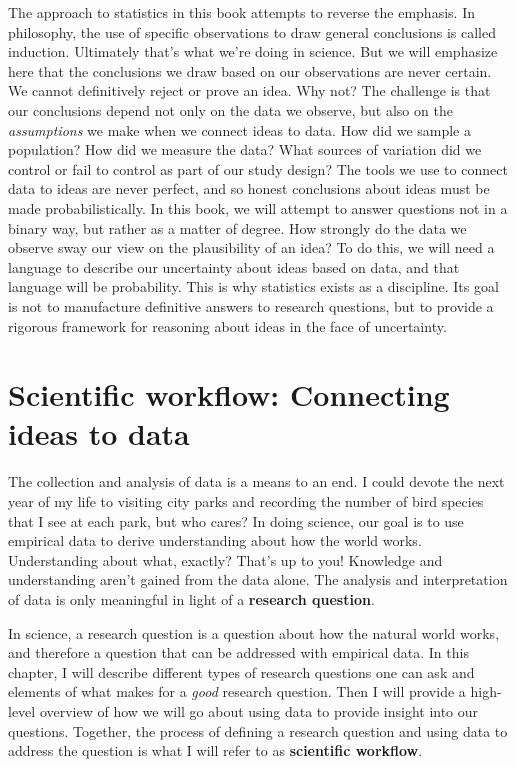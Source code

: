 \documentclass[
]{book}
\begin{document}
The approach to statistics in this book attempts to reverse the emphasis. In philosophy, the use of specific observations to draw general conclusions is called induction. Ultimately that's what we're doing in science. But we will emphasize here that the conclusions we draw based on our observations are never certain. We cannot definitively reject or prove an idea. Why not? The challenge is that our conclusions depend not only on the data we observe, but also on the \emph{assumptions} we make when we connect ideas to data. How did we sample a population? How did we measure the data? What sources of variation did we control or fail to control as part of our study design? The tools we use to connect data to ideas are never perfect, and so honest conclusions about ideas must be made probabilistically. In this book, we will attempt to answer questions not in a binary way, but rather as a matter of degree. How strongly do the data we observe sway our view on the plausibility of an idea? To do this, we will need a language to describe our uncertainty about ideas based on data, and that language will be probability.
This is why statistics exists as a discipline. Its goal is not to manufacture definitive answers to research questions, but to provide a rigorous framework for reasoning about ideas in the face of uncertainty.

\chapter{Scientific workflow: Connecting ideas to data}\label{scientific-workflow-connecting-ideas-to-data}

The collection and analysis of data is a means to an end. I could devote the next year of my life to visiting city parks and recording the number of bird species that I see at each park, but who cares? In doing science, our goal is to use empirical data to derive understanding about how the world works. Understanding about what, exactly? That's up to you! Knowledge and understanding aren't gained from the data alone. The analysis and interpretation of data is only meaningful in light of a \textbf{research question}.

In science, a research question is a question about how the natural world works, and therefore a question that can be addressed with empirical data. In this chapter, I will describe different types of research questions one can ask and elements of what makes for a \emph{good} research question. Then I will provide a high-level overview of how we will go about using data to provide insight into our questions. Together, the process of defining a research question and using data to address the question is what I will refer to as \textbf{scientific workflow}.
\end{document}
